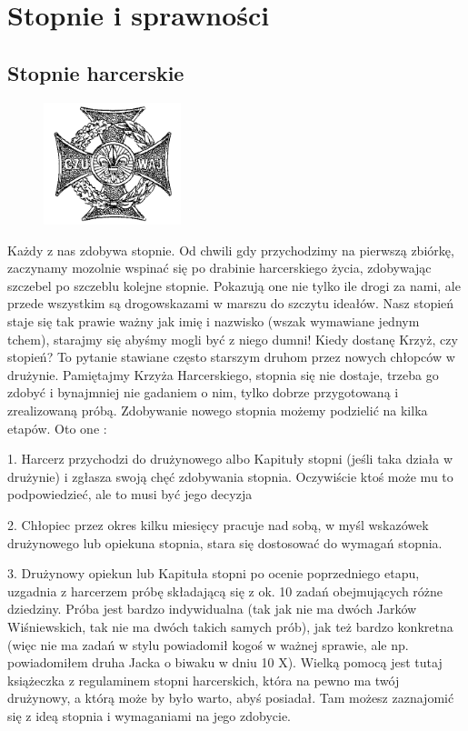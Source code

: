 \chapter{Stopnie i sprawności}
\section{Stopnie harcerskie}
\begin{figure}
  \begin{center}
    \includegraphics[width=4cm]{grafiki/krzyz.png}
  \end{center}
\end{figure} 
Każdy z nas zdobywa stopnie. Od chwili gdy przychodzimy na pierwszą zbiórkę, zaczynamy mozolnie wspinać się po drabinie harcerskiego życia, zdobywając szczebel po szczeblu kolejne stopnie. Pokazują one nie tylko ile drogi za nami,  ale przede wszystkim są drogowskazami w marszu do szczytu  ideałów.
	Nasz stopień staje się tak prawie ważny jak imię i nazwisko (wszak wymawiane jednym tchem), starajmy się abyśmy mogli być  z  niego dumni! Kiedy dostanę Krzyż, czy stopień? To pytanie stawiane często starszym druhom przez nowych chłopców w drużynie.  Pamiętajmy Krzyża Harcerskiego, stopnia się nie dostaje, trzeba go zdobyć i bynajmniej nie gadaniem o nim, tylko dobrze przygotowaną i zrealizowaną próbą. Zdobywanie nowego stopnia możemy podzielić na kilka etapów.  Oto one :


1.
Harcerz  przychodzi  do  drużynowego  albo Kapituły stopni (jeśli taka działa w drużynie) i zgłasza swoją  chęć  zdobywania  stopnia. Oczywiście  ktoś może mu to podpowiedzieć,  ale to musi być jego decyzja

2.
Chłopiec  przez  okres  kilku  miesięcy  pracuje  nad  sobą,  w   myśl  wskazówek drużynowego  lub  opiekuna  stopnia, stara  się  dostosować do wymagań stopnia.

3.
Drużynowy  opiekun lub Kapituła stopni  po  ocenie poprzedniego  etapu, uzgadnia  z harcerzem próbę  składającą się  z  ok. 10  zadań obejmujących  różne  dziedziny. Próba  jest  bardzo indywidualna (tak  jak  nie  ma  dwóch Jarków  Wiśniewskich, tak  nie ma dwóch takich samych prób), jak  też  bardzo  konkretna (więc nie ma  zadań  w  stylu powiadomił kogoś  w  ważnej sprawie, ale  np. powiadomiłem  druha Jacka  o  biwaku w  dniu  10 X). Wielką pomocą jest tutaj książeczka z regulaminem stopni harcerskich, która na pewno ma twój drużynowy, a którą może by było warto, abyś posiadał. Tam możesz zaznajomić się z ideą stopnia i wymaganiami na jego zdobycie.

